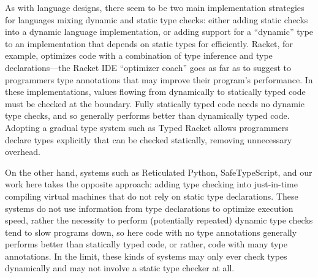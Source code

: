 As with language designs, there seem to be two main implementation
strategies for languages mixing dynamic and static type checks: either
adding static checks into a dynamic language implementation, or adding
support for a ``dynamic'' type to an implementation that depends on
static types for efficiently. Racket, for example, optimizes code with
a combination of type inference and type declarations---the Racket
IDE ``optimizer coach'' goes as far as to suggest to programmers type
annotations that may improve their program's performance\citep{optimizerCoach2012}. In these implementations, values flowing
from dynamically to statically typed code must be checked at the
boundary.  Fully statically typed code needs no dynamic type checks,
and so generally performs better than dynamically typed code. Adopting
a gradual type system such as Typed Racket\citep{typedScheme08} allows
programmers declare types explicitly that can be checked statically,
removing unnecessary overhead.

On the other hand, systems such as Reticulated Python\citep{reticPython2014}, SafeTypeScript\citep{Richards2017}, and our
work here takes the opposite approach: adding type checking into
just-in-time compiling virtual machines that do not rely on static
type declarations. These systems do not use information from type
declarations to optimize execution speed, rather the necessity to
perform (potentially repeated) dynamic type checks tend to slow
programs down, so here code with no type annotations generally
performs better than statically typed code, or rather, code with many
type annotations. In the limit, these kinds of systems may only ever
check types dynamically and may not involve a static type checker at
all. 

